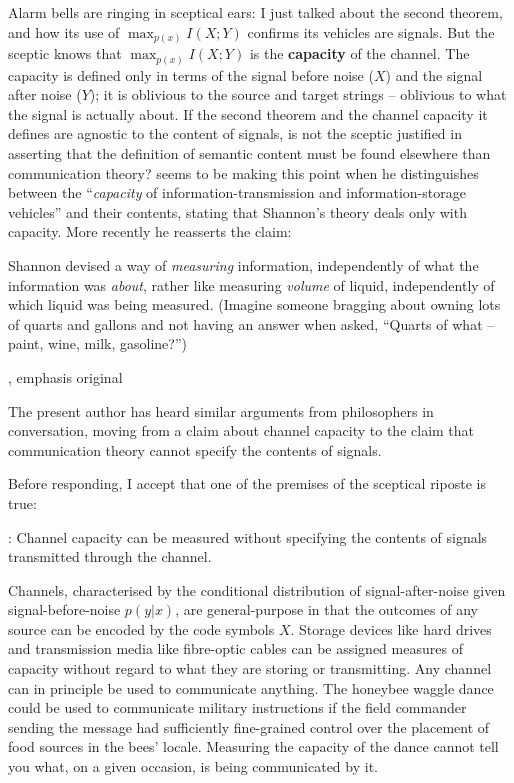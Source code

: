 \documentclass[12pt]{article}
\begin{document}
Alarm bells are ringing in sceptical ears: I just talked about the second theorem, and how its use of $\max_{p(x)}I(X;Y)$ confirms its vehicles are signals.
But the sceptic knows that $\max_{p(x)}I(X;Y)$ is the \textbf{capacity} of the channel.
The capacity is defined only in terms of the signal before noise ($X$) and the signal after noise ($Y$); it is oblivious to the source and target strings -- oblivious to what the signal is actually about.
If the second theorem and the channel capacity it defines are agnostic to the content of signals, is not the sceptic justified in asserting that the definition of semantic content must be found elsewhere than communication theory?
\citet[344]{dennett1983intentional} seems to be making this point when he distinguishes between the ``\textit{capacity} of information-transmission and information-storage vehicles'' and their contents, stating that Shannon's theory deals only with capacity.
More recently he reasserts the claim:

\begin{myquote}
Shannon devised a way of \textit{measuring} information, independently of what the information was \textit{about}, rather like measuring \textit{volume} of liquid, independently of which liquid was being measured. (Imagine someone bragging about owning lots of quarts and gallons and not having an answer when asked, ``Quarts of what -- paint, wine, milk, gasoline?'')
\par\hspace*{\fill}\citet[106]{dennett2017bacteria}, emphasis original
\end{myquote}

\noindent The present author has heard similar arguments from philosophers in conversation, moving from a claim about channel capacity to the claim that communication theory cannot specify the contents of signals.

Before responding, I accept that one of the premises of the sceptical riposte is true:

\begin{myquote}
\cia{}: Channel capacity can be measured without specifying the contents of signals transmitted through the channel.
\end{myquote}

\noindent Channels, characterised by the conditional distribution of signal-after-noise given signal-before-noise $p(y|x)$, are general-purpose in that the outcomes of any source can be encoded by the code symbols $X$.
Storage devices like hard drives and transmission media like fibre-optic cables can be assigned measures of capacity without regard to what they are storing or transmitting.
Any channel can in principle be used to communicate anything.
The honeybee waggle dance could be used to communicate military instructions if the field commander sending the message had sufficiently fine-grained control over the placement of food sources in the bees' locale.
Measuring the capacity of the dance cannot tell you what, on a given occasion, is being communicated by it.
\end{document}
